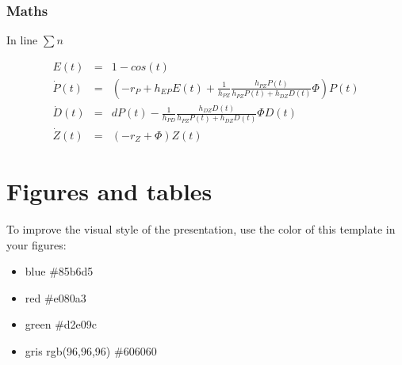 \documentclass{eecslides}
\begin{document}
\begin{frame}

  \frametitle{Maths}

  In line $\sum n$

  \begin{eqnarray}
    E(t) &=& 1 - cos(t) \\
    \dot{P}(t) &=& \left(-r_P + h_{EP}E(t) + \frac{1}{h_{PZ}}\frac{h_{PZ}P(t)}{h_{PZ}P(t)+h_{DZ}D(t)}\Phi \right)P(t)\\
    \dot{D}(t) &=& dP(t) -  \frac{1}{h_{PD}}\frac{h_{DZ}D(t)}{h_{PZ}P(t)+h_{DZ}D(t)}\Phi D(t)\\
    \dot{Z}(t) &=& \left(-r_Z+\Phi\right)Z(t)
  \end{eqnarray}

\end{frame}


    \section{Figures and tables}

    \begin{frame}
        To improve the visual style of the presentation, use the color of this
        template in your figures:

        \begin{itemize}
          \item blue \#85b6d5
          \item red \#e080a3
          \item green \#d2e09c
          \item gris rgb(96,96,96) \#606060
        \end{itemize}

      \end{frame}
\end{document}

